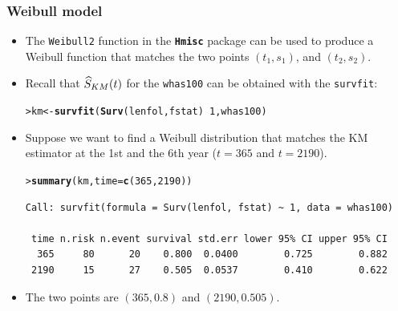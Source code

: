\documentclass[10pt]{beamer}\usepackage[]{graphicx}\usepackage[]{color}
\makeatletter
\newcommand{\hlnum}[1]{\textcolor[rgb]{0.686,0.059,0.569}{#1}}%
\newcommand{\hlopt}[1]{\textcolor[rgb]{0,0,0}{#1}}%
\newcommand{\hlstd}[1]{\textcolor[rgb]{0.345,0.345,0.345}{#1}}%
\newcommand{\hlkwb}[1]{\textcolor[rgb]{0.69,0.353,0.396}{#1}}%
\newcommand{\hlkwc}[1]{\textcolor[rgb]{0.333,0.667,0.333}{#1}}%
\newcommand{\hlkwd}[1]{\textcolor[rgb]{0.737,0.353,0.396}{\textbf{#1}}}%
\newenvironment{kframe}{%
 \def\at@end@of@kframe{}%
 \ifinner\ifhmode%
  \def\at@end@of@kframe{\end{minipage}}%
  \begin{minipage}{\columnwidth}%
 \fi\fi%
 \def\FrameCommand##1{\hskip\@totalleftmargin \hskip-\fboxsep
 \colorbox{shadecolor}{##1}\hskip-\fboxsep
     \hskip-\linewidth \hskip-\@totalleftmargin \hskip\columnwidth}%
 \MakeFramed {\advance\hsize-\width
   \@totalleftmargin\z@ \linewidth\hsize
   \@setminipage}}%
 {\par\unskip\endMakeFramed%
 \at@end@of@kframe}
\newenvironment{knitrout}{}{} %
\renewenvironment{knitrout}{\setlength{\topsep}{-.2mm}}{}
\newcommand{\pkg}[1]{{\textbf{\texttt{#1}}}}
\newcommand{\code}[1]{{\texttt{#1}}}
\newcommand{\Skm}{\widehat{S}_{\scriptsize{KM}}}
\makeatother
\begin{document}
\begin{frame}[fragile]
  \frametitle{Weibull model}
  \begin{itemize}
  \item The \code{Weibull2} function in the \pkg{Hmisc} package can be
    used to produce a Weibull function that matches the two points
    $(t_1, s_1)$, and $(t_2, s_2)$.
  \item Recall that $\Skm(t)$ for the \code{whas100} can be obtained with
    the \code{survfit}:

\begin{knitrout}\scriptsize
{}\color{fgcolor}\begin{kframe}
\begin{alltt}
\hlstd{> } \hlstd{km} \hlkwb{<-} \hlkwd{survfit}\hlstd{(}\hlkwd{Surv}\hlstd{(lenfol, fstat)} \hlopt{~} \hlnum{1}\hlstd{, whas100)}
\end{alltt}
\end{kframe}
\end{knitrout}
\item Suppose we want to find a Weibull distribution that
  matches the KM estimator at the 1st and the 6th year
  ($t = 365$ and $t = 2190$).
\begin{knitrout}\scriptsize
{}\color{fgcolor}\begin{kframe}
\begin{alltt}
\hlstd{> }\hlkwd{summary}\hlstd{(km,} \hlkwc{time} \hlstd{=} \hlkwd{c}\hlstd{(}\hlnum{365}\hlstd{,} \hlnum{2190}\hlstd{))}
\end{alltt}
\begin{verbatim}
Call: survfit(formula = Surv(lenfol, fstat) ~ 1, data = whas100)

 time n.risk n.event survival std.err lower 95% CI upper 95% CI
  365     80      20    0.800  0.0400        0.725        0.882
 2190     15      27    0.505  0.0537        0.410        0.622
\end{verbatim}
\end{kframe}
\end{knitrout}
\item The two points are $(365, 0.8)$ and $(2190, 0.505)$.
\end{itemize}
\end{frame}
\end{document}
